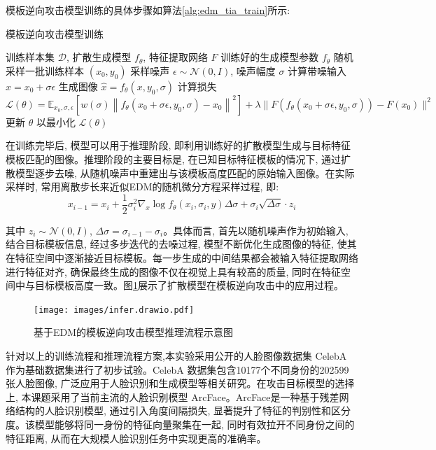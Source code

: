 模板逆向攻击模型训练的具体步骤如算法\ref{alg:edm_tia_train}所示:

\begin{algorithm}[H]
  \caption{模板逆向攻击模型训练}
  \label{alg:edm_tia_train}
  \begin{algorithmic}[1]
    \REQUIRE 训练样本集 $\mathcal{D}$, 扩散生成模型 $f_\theta$, 特征提取网络 $F$
    \ENSURE 训练好的生成模型参数 $f_\theta$
    \STATE 随机采样一批训练样本 $(x_0, y_0)$
    \STATE 采样噪声 $\epsilon \sim \mathcal{N}(0, I)$, 噪声幅度 $\sigma$
    \STATE 计算带噪输入 $x = x_0 + \sigma \epsilon$
    \STATE 生成图像 $\hat{x} = f_\theta(x, y_0, \sigma)$
    \STATE 计算损失
    \[
      \mathcal{L}(\theta) = \mathbb{E}_{x_0, \sigma, \epsilon} \left[ w(\sigma) \left\|  f_\theta(x_0 + \sigma \epsilon,y_0,\sigma) - x_0 \right\|^2 \right]
      + \lambda \| F( f_\theta(x_0 + \sigma \epsilon,y_0,\sigma)) - F(x_0) \|^2
    \]
    \ENDFOR
    \STATE 更新 $\theta$ 以最小化 $\mathcal{L}(\theta)$
    \ENDFOR
  \end{algorithmic}
\end{algorithm}


在训练完毕后, 模型可以用于推理阶段, 即利用训练好的扩散模型生成与目标特征模板匹配的图像。推理阶段的主要目标是, 在已知目标特征模板的情况下, 通过扩散模型逐步去噪, 从随机噪声中重建出与该模板高度匹配的原始输入图像。在实际采样时, 常用离散步长来近似EDM的随机微分方程采样过程, 即:
\[
  x_{i-1} = x_i + \frac{1}{2} \sigma_i^2 \nabla_x \log f_\theta(x_i, \sigma_i, y) \Delta \sigma + \sigma_i \sqrt{\Delta \sigma} \cdot z_i
\]

其中 $z_i \sim \mathcal{N}(0, I)$, $\Delta \sigma = \sigma_{i-1} - \sigma_i$。具体而言, 首先以随机噪声作为初始输入, 结合目标模板信息, 经过多步迭代的去噪过程, 模型不断优化生成图像的特征, 使其在特征空间中逐渐接近目标模板。每一步生成的中间结果都会被输入特征提取网络进行特征对齐, 确保最终生成的图像不仅在视觉上具有较高的质量, 同时在特征空间中与目标模板高度一致。图\ref{fig:edm_tia_infer}展示了扩散模型在模板逆向攻击中的应用过程。



\begin{figure}[!htbp]
  \centering
  \texttt{[image: images/infer.drawio.pdf]}
  \caption{基于EDM的模板逆向攻击模型推理流程示意图}
  \label{fig:edm_tia_infer}
\end{figure}

针对以上的训练流程和推理流程方案,本实验采用公开的人脸图像数据集 CelebA 作为基础数据集进行了初步试验。CelebA 数据集包含10177个不同身份的202599张人脸图像, 广泛应用于人脸识别和生成模型等相关研究。在攻击目标模型的选择上, 本课题采用了当前主流的人脸识别模型 ArcFace。ArcFace是一种基于残差网络结构的人脸识别模型, 通过引入角度间隔损失, 显著提升了特征的判别性和区分度。该模型能够将同一身份的特征向量聚集在一起, 同时有效拉开不同身份之间的特征距离, 从而在大规模人脸识别任务中实现更高的准确率。

